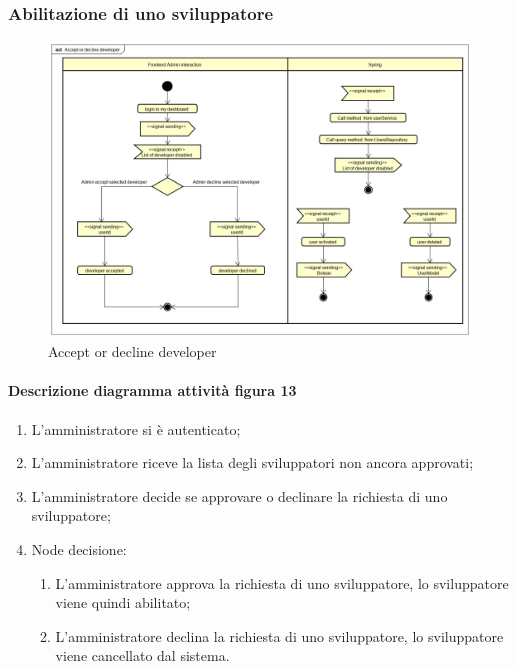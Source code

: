 \subsubsection{Abilitazione di uno sviluppatore}
\begin{figure}[H]
\centering
\includegraphics[width=17cm, keepaspectratio]{img/Accept-or-decline-developer.png} 
\caption{Accept or decline developer}
\end{figure}

\paragraph{Descrizione diagramma attività figura 13}
\begin{enumerate}
\item L'amministratore si è autenticato;
\item L'amministratore riceve la lista degli sviluppatori non ancora approvati; 
\item L'amministratore decide se approvare o declinare la richiesta di uno sviluppatore; 
\item Node decisione:
\begin{enumerate}
	\item L'amministratore approva la richiesta di uno sviluppatore, lo sviluppatore viene quindi abilitato;
	\item L'amministratore declina la richiesta di uno sviluppatore, lo sviluppatore viene cancellato dal sistema. 
\end{enumerate}
\end{enumerate}




